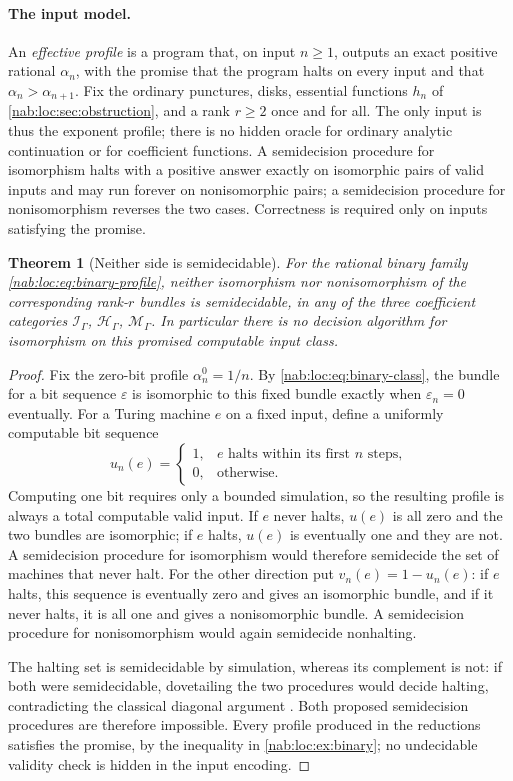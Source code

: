 \documentclass[11pt,letterpaper]{article}
\newtheorem{theorem}{Theorem}[section]
\theoremstyle{definition}
\theoremstyle{remark}
\newcommand{\HH}{\mathscr H_\Gamma}
\newcommand{\II}{\mathscr I_\Gamma}
\newcommand{\MM}{\mathscr M_\Gamma}
\numberwithin{equation}{section}
\begin{document}
\paragraph{The input model.}
An \emph{effective profile} is a program that, on input $n\geq1$, outputs an
exact positive rational $\alpha_n$, with the promise that the program halts on
every input and that $\alpha_n>\alpha_{n+1}$. Fix the ordinary punctures, disks,
essential functions $h_n$ of \cref{nab:loc:sec:obstruction}, and a rank
$r\geq2$ once and for all. The only input is thus the exponent profile; there is
no hidden oracle for ordinary analytic continuation or for coefficient
functions. A semidecision procedure for isomorphism halts with a positive
answer exactly on isomorphic pairs of valid inputs and may run forever on
nonisomorphic pairs; a semidecision procedure for nonisomorphism reverses the
two cases. Correctness is required only on inputs satisfying the promise.

\begin{theorem}[Neither side is semidecidable]\label{nab:loc:thm:undecidable}
For the rational binary family \eqref{nab:loc:eq:binary-profile}, neither
isomorphism nor nonisomorphism of the corresponding rank-$r$ bundles is
semidecidable, in any of the three coefficient categories $\II$, $\HH$, $\MM$.
In particular there is no decision algorithm for isomorphism on this promised
computable input class.
\end{theorem}

\begin{proof}
Fix the zero-bit profile $\alpha_n^0=1/n$. By \eqref{nab:loc:eq:binary-class},
the bundle for a bit sequence $\varepsilon$ is isomorphic to this fixed bundle
exactly when $\varepsilon_n=0$ eventually. For a Turing machine $e$ on a fixed
input, define a uniformly computable bit sequence
\[
 u_n(e)=
 \begin{cases}
 1,&e\text{ halts within its first }n\text{ steps},\\
 0,&\text{otherwise}.
 \end{cases}
\]
Computing one bit requires only a bounded simulation, so the resulting profile
is always a total computable valid input. If $e$ never halts, $u(e)$ is all
zero and the two bundles are isomorphic; if $e$ halts, $u(e)$ is eventually one
and they are not. A semidecision procedure for isomorphism would therefore
semidecide the set of machines that never halt. For the other direction put
$v_n(e)=1-u_n(e)$: if $e$ halts, this sequence is eventually zero and gives an
isomorphic bundle, and if it never halts, it is all one and gives a
nonisomorphic bundle. A semidecision procedure for nonisomorphism would again
semidecide nonhalting.

The halting set is semidecidable by simulation, whereas its complement is not:
if both were semidecidable, dovetailing the two procedures would decide halting,
contradicting the classical diagonal argument \cite{Turing}. Both proposed
semidecision procedures are therefore impossible. Every profile produced in the
reductions satisfies the promise, by the inequality in \cref{nab:loc:ex:binary};
no undecidable validity check is hidden in the input encoding.
\end{proof}
\end{document}
